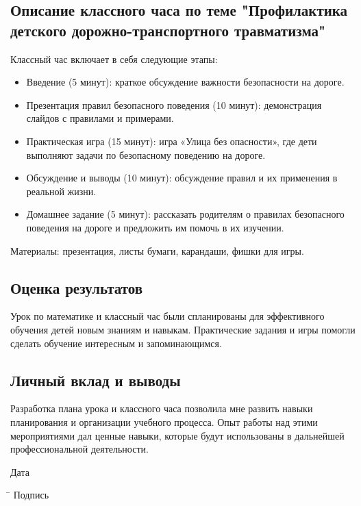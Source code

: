 \documentclass[a4paper,12pt]{article}
\begin{document}
\subsection*{Описание классного часа по теме "Профилактика детского дорожно-транспортного травматизма"}
Классный час включает в себя следующие этапы:
\begin{itemize}
    \item Введение (5 минут): краткое обсуждение важности безопасности на дороге.
    \item Презентация правил безопасного поведения (10 минут): демонстрация слайдов с правилами и примерами.
    \item Практическая игра (15 минут): игра «Улица без опасности», где дети выполняют задачи по безопасному поведению на дороге.
    \item Обсуждение и выводы (10 минут): обсуждение правил и их применения в реальной жизни.
    \item Домашнее задание (5 минут): рассказать родителям о правилах безопасного поведения на дороге и предложить им помочь в их изучении.
\end{itemize}

Материалы: презентация, листы бумаги, карандаши, фишки для игры.

\subsection*{Оценка результатов}

Урок по математике и классный час были спланированы для эффективного обучения детей новым знаниям и навыкам. Практические задания и игры помогли сделать обучение интересным и запоминающимся.

\subsection*{Личный вклад и выводы}

Разработка плана урока и классного часа позволила мне развить навыки планирования и организации учебного процесса. Опыт работы над этими мероприятиями дал ценные навыки, которые будут использованы в дальнейшей профессиональной деятельности.
\vspace{10mm}

\noindent
Дата \underline{\hspace{5cm}}
\begin{tabbing}
\hspace{2cm} \= \kill
Подпись \> \underline{\hspace{4cm}}
\end{tabbing}
\end{document}
